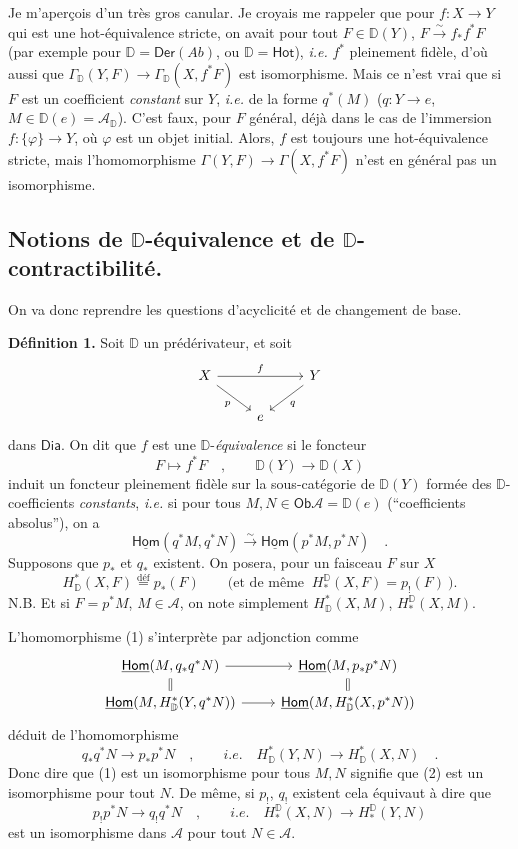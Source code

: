 \documentclass[11pt]{article}
\newcommand{\printedpage}[1]{\marginpar{\footnotesize p.~#1}}
\newcommand{\msp}[1]{\marginpar{\footnotesize [#1]}}
\newcommand{\Ob}{\mathsf{Ob}}
\newcommand{\Dia}{\mathsf{Dia}}
\newcommand{\DD}{\mathbb{D}}
\newcommand{\Hom}{\underline{\mathsf{Hom}}}
\newcommand{\cA}{\mathcal{A}}
\newcommand{\Hot}{\mathsf{Hot}}
\newcommand{\isoto}{\overset{\sim}{\to}}
\newcommand{\isolongto}{\overset{\sim}{\longrightarrow}}
\begin{document}
Je m'aperçois d'un très gros canular. Je croyais me rappeler que pour $f : X \to Y$ qui est une hot-équivalence stricte, on avait pour tout $F \in \DD(Y)$, $F \isoto f_*f^*F$ (par exemple pour $\DD = \mathsf{Der}(\mathit{Ab})$, ou $\DD = \Hot$), \textit{i.e.} $f^*$ pleinement fidèle, d'où aussi que $\Gamma_{\DD}(Y, F) \to \Gamma_{\DD}(X, f^*F)$ est isomorphisme. Mais ce n'est vrai que si $F$ est un coefficient \textit{constant} sur $Y$, \textit{i.e.} de la forme $q^*(M)$ ($q : Y \to e$, $M \in \DD(e) = \cA_{\DD}$). C'est faux, pour $F$ général, déjà dans le cas de l'immersion $f : \{\varphi\} \to Y$, où $\varphi$ est un objet initial. Alors, $f$ est toujours une hot-équivalence stricte, mais l'homomorphisme $\Gamma(Y, F) \to \Gamma(X, f^*F)$ n'est en général pas un isomorphisme.

\clearpage
\printedpage{35}
\noindent\msp{page 61}

\subsection*{Notions de $\mathbb{D}$-équivalence et de $\mathbb{D}$-contractibilité.}

On va donc reprendre les questions d'acyclicité et de changement de base.

\noindent\textbf{Définition 1.} Soit $\DD$ un prédérivateur, et soit
\[
\begin{tikzcd}
X \arrow[rr, "f"] \arrow[dr, "p"'] & & Y \arrow[dl, "q"] \\
& e &
\end{tikzcd}
\]
dans $\Dia$. On dit que $f$ est une $\DD$-\textit{équivalence} si le foncteur
\[
F \longmapsto f^*F \quad , \qquad \DD(Y) \longrightarrow \DD(X)
\]
induit un foncteur pleinement fidèle sur la sous-catégorie de $\DD(Y)$ formée des $\DD$-coefficients \textit{constants}, \textit{i.e.} si pour tous $M, N \in \Ob \cA = \DD(e)$ (“coefficients absolus”), on a
\[
\Hom(q^*M, q^*N) \isolongto \Hom(p^*M, p^*N) \quad . \tag*{(1)}
\]
Supposons que $p_*$ et $q_*$ existent. On posera, pour un faisceau $F$ sur $X$
\[
H^*_{\DD}(X, F) \overset{\text{déf}}{=} p_*(F) \qquad \text{(et de même } \ H^{\DD}_*(X, F) = p_!(F) \ \text{).}
\]
N.B. Et si $F = p^*M$, $M \in \cA$, on note simplement $H^*_{\DD}(X, M)$, $H^{\DD}_*(X, M)$.

\noindent L'homomorphisme (1) s'interprète par adjonction comme
\[
\begin{tikzcd}[row sep=small]
\Hom(M, q_*q^*N) \arrow[r] \arrow[d, equal] & \Hom(M, p_*p^*N) \arrow[d, equal] \\
\Hom(M, H^*_{\DD}(Y, q^*N)) \arrow[r] & \Hom(M, H^*_{\DD}(X, p^*N))
\end{tikzcd}
\]
déduit de l'homomorphisme
\[
q_*q^*N \longrightarrow p_*p^*N \quad , \qquad \textit{i.e.} \quad H^*_{\DD}(Y, N) \longrightarrow H^*_{\DD}(X, N) \quad . \tag*{(2)}
\]
Donc dire que (1) est un isomorphisme pour tous $M, N$ signifie que (2) est un isomorphisme pour tout $N$. De même, si $p_!$, $q_!$ existent cela équivaut à dire que
\[
p_!p^*N \longrightarrow q_!q^*N \quad , \qquad \textit{i.e.} \quad H^{\DD}_*(X, N) \longrightarrow H^{\DD}_*(Y, N) \tag*{$(2')$}
\]
est un isomorphisme dans $\cA$ pour tout $N \in \cA$.
\end{document}
